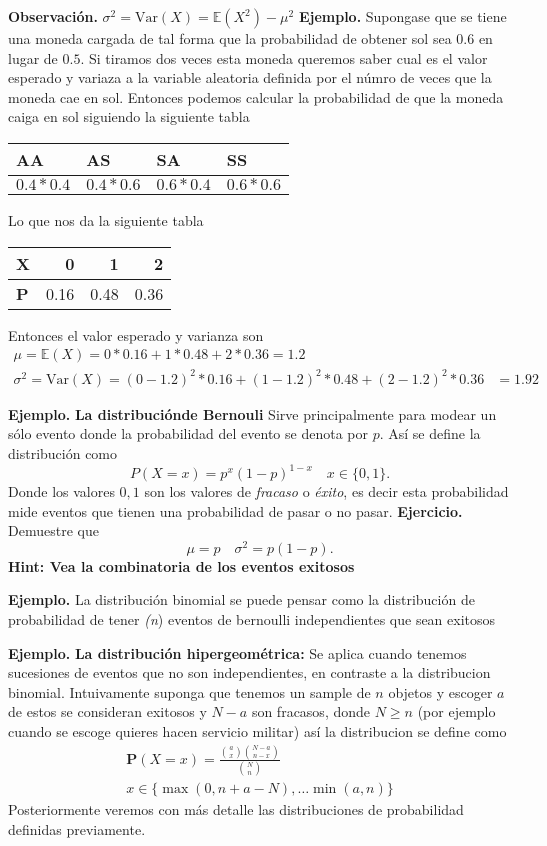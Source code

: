 \documentclass[letterpaper]{book}
\newcommand{\prob}{\textbf{P}}
\newcommand{\esp}{\mathbb E}
\newcommand{\eje}{{\newline \noindent \sc \textbf{Ejercicio. }}}
\newcommand{\exe}{{\newline \noindent \sc \textbf{Ejemplo. }}}
\newcommand{\obs}{{\newline \noindent \sc \textbf{Observación. }}}
\begin{document}
\obs \(\sigma^2=\mathrm{Var}(X)=\esp(X^2)-\mu^2\)
\exe Supongase que se tiene una moneda cargada de tal forma que la probabilidad de obtener sol sea \(0.6\) en lugar de \(0.5\). Si tiramos dos veces esta moneda queremos saber cual es el valor esperado y variaza a la variable aleatoria definida por el númro de veces que la moneda cae en sol. Entonces podemos calcular la probabilidad de que la moneda caiga en sol siguiendo la siguiente tabla
\begin{center}
\begin{tabular}{llll}
AA & AS & SA & SS\\
\hline
\(0.4*0.4\) & \(0.4*0.6\) & \(0.6*0.4\) & \(0.6*0.6\)\\
\end{tabular}
\end{center}
Lo que nos da la siguiente tabla
\begin{center}
\begin{tabular}{lrrr}
X & 0 & 1 & 2\\
\hline
\textbf{P} & 0.16 & 0.48 & 0.36\\
\end{tabular}
\end{center}
Entonces el valor esperado y varianza son
\begin{align*}
    \mu=\esp(X)= 0*0.16+1*0.48+2*0.36=1.2\\
    \sigma^2=\mathrm{Var}(X)=(0-1.2)^2*0.16+(1-1.2)^2*0.48+(2-1.2)^2*0.36&=1.92
\end{align*}

\exe \textbf{La distribuciónde Bernouli} Sirve principalmente para modear un sólo evento donde la probabilidad del evento se denota por \(p\). Así se define la distribución como
\[
    P(X=x)=p^{x}(1-p)^{1-x}\quad x\in\{0,1\}.
\]
\noindent Donde los valores \(0,1\) son los valores de \emph{fracaso} o \emph{éxito}, es decir esta probabilidad mide eventos que tienen una probabilidad de pasar o no pasar.
\eje Demuestre que
\[
    \mu=p\quad\sigma^2=p(1-p).
\]
\textbf{Hint: Vea la combinatoria de los eventos exitosos}


\exe La distribución binomial se puede pensar como la distribución de probabilidad de tener \emph{(n}) eventos de bernoulli independientes que sean exitosos

\exe \textbf{La distribución hipergeométrica:} Se aplica cuando tenemos sucesiones de eventos que no son independientes, en contraste a la distribucion binomial. Intuivamente suponga que tenemos un sample de \(n\) objetos y escoger \(a\) de estos se consideran exitosos y \(N-a\) son fracasos, donde \(N \geq n\) (por ejemplo cuando se escoge quieres hacen servicio militar) así la distribucion se define como
\begin{align*}
\prob(X=x)=\frac{{a\choose x}{N-a\choose n-x}}{{N\choose n}}\\
x\in\{\max(0,n+a-N),\dots\min(a,n)\}
\end{align*}
Posteriormente veremos con más detalle las distribuciones de probabilidad definidas previamente.
\end{document}

